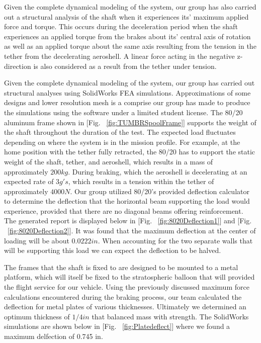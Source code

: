 \indent\indent Given the complete dynamical modeling of the system, our group has also carried out a structural analysis of the shaft when it experiences its' maximum applied force and torque. This occurs during the deceleration period when the shaft experiences an applied torque from the brakes about its' central axis of rotation as well as an applied torque about the same axis resulting from the tension in the tether from the decelerating aeroshell. A linear force acting in the negative z-direction is also considered as a result from the tether under tension. 

\indent\indent Given the complete dynamical modeling of the system, our group has carried out structural analyses using SolidWorks FEA simulations. Approximations of some designs and lower resolution mesh is a comprise our group has made to produce the simulations using the software under a limited student license. The 80/20 aluminum frame shown in [Fig. ~\ref{fig:TUMBRSpoolFrame}] supports the weight of the shaft throughout the duration of the test. The expected load fluctuates depending on where the system is in the mission profile. For example, at the home position with the tether fully retracted, the 80/20 has to support the static weight of the shaft, tether, and aeroshell, which results in a mass of approximately $200 kg$. During braking, which the aeroshell is decelerating at an expected rate of $3 g's$, which results in a tension within the tether of approximately $4000 N$. Our group utilized 80/20's provided deflection calculator to determine the deflection that the horizontal beam supporting the load would experience, provided that there are no diagonal beams offering reinforcement. The generated report is displayed below in [Fig. ~\ref{fig:8020Deflection1}] and [Fig. ~\ref{fig:8020Deflection2}]. It was found that the maximum deflection at the center of loading will be about $0.0222 in$. When accounting for the two separate walls that will be supporting this load we can expect the deflection to be halved. 

The frames that the shaft is fixed to are designed to be mounted to a metal platform, which will itself be fixed to the stratospheric balloon that will provided the flight service for our vehicle. Using the previously discussed maximum force calculations encountered during the braking process, our team calculated the deflection for metal plates of various thicknesses. Ultimately we determined an optimum thickness of $1/4 in$ that balanced mass with strength. The SolidWorks simulations are shown below in [Fig. ~\ref{fig:Platedeflect}] where we found a maximum delfection of 0.745 in. 

